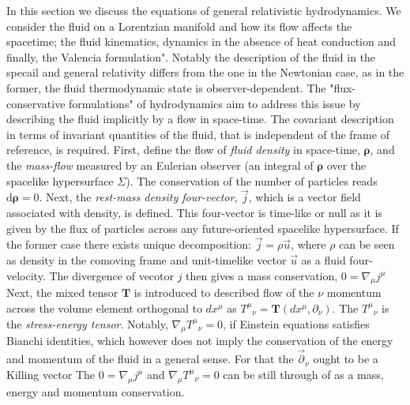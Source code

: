 In this section we discuss the equations of general relativistic hydrodynamics. 
We consider the fluid on a Lorentzian manifold and how its flow affects the spacetime; the fluid kinematics, dynamics in the absence of heat conduction and finally, the Valencia formulation".
Notably the description of the fluid in the specail and general relativity differs from the one in the Newtonian case, as in the former, the fluid thermodynamic state is observer-dependent.
The "flux-conservative formulations" of hydrodynamics aim to address this issue by describing the fluid implicitly by a flow in space-time. 
The covariant description in terms of invariant quantities of the fluid, that is independent of the frame of reference, is required. 
First, define the flow of \textit{fluid density} in space-time, $\boldsymbol{\rho}$, and the \textit{mass-flow} measured by an Eulerian observer (an integral of $\boldsymbol{\rho}$ over the spacelike hypersurface $\Sigma$). 
The conservation of the number of particles reads $\text{d}\boldsymbol{\rho}=0$. 
Next, the \textit{rest-mass density four-vector}, $\vec{j}$, which is a vector field associated with density, is defined. This four-vector is time-like or null as it is given by the flux of particles across any future-oriented spacelike hypersurface. 
If the former case there exists unique decomposition: $\vec{j} = \rho \vec{u}$, where $\rho$ can be seen as density in the comoving frame and unit-timelike vector $\vec{u}$ as a fluid four-velocity.
The divergence of vecotor $j$ then gives a mass conservation, $0 = \nabla_{\mu}j^{\mu}$
Next, the mixed tensor $\boldsymbol{T}$ is introduced to described flow of the $\nu$ momentum across the volume element orthogonal to $dx^{\mu}$ as ${T^{\mu}}_{\nu}=\boldsymbol{T}(dx^{\mu},\partial_{\nu})$.
The ${T^{\mu}}_{\nu}$ is the \textit{stress-energy tensor}. Notably, $\nabla_{\mu}{T^{\mu}}_{\nu} = 0$, if Einstein equations satisfies Bianchi identities, which however does not imply the conservation of the energy and momentum of the fluid in a general sense. For that the $\vec{\partial}_{\nu}$ ought to be a Killing vector
The $0 = \nabla_{\mu}j^{\mu}$ and $\nabla_{\mu}{T^{\mu}}_{\nu} = 0$ can be still through of as a mass, energy and momentum conservation.

